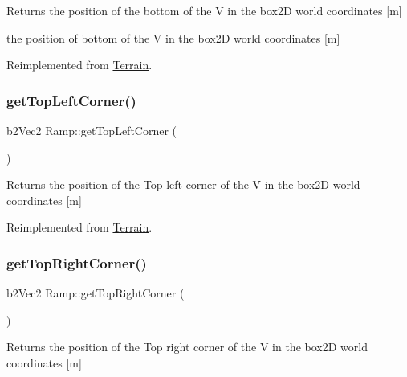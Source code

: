 \begin{DoxyReturn}{Returns}
the position of the bottom of the V in the box2D world coordinates \mbox{[}m\mbox{]}

the position of bottom of the V in the box2D world coordinates \mbox{[}m\mbox{]} 
\end{DoxyReturn}


Reimplemented from \mbox{\hyperlink{class_terrain_a26e1c7c05b8256015730df34d97d29c2}{Terrain}}.

\mbox{\label{class_ramp_aefcb53f7b43d3706400e7f16c77a7e18}} 
\subsubsection{\texorpdfstring{get\+Top\+Left\+Corner()}{getTopLeftCorner()}}
{\footnotesize\ttfamily b2\+Vec2 Ramp\+::get\+Top\+Left\+Corner (\begin{DoxyParamCaption}{ }\end{DoxyParamCaption})\hspace{0.3cm}{\ttfamily [virtual]}}

\begin{DoxyReturn}{Returns}
the position of the Top left corner of the V in the box2D world coordinates \mbox{[}m\mbox{]} 
\end{DoxyReturn}


Reimplemented from \mbox{\hyperlink{class_terrain_a8a8629396e5cb03961649acdc23eacf2}{Terrain}}.

\mbox{\label{class_ramp_a72b5d41278e4ff65df8f80657ae7d9e1}} 
\subsubsection{\texorpdfstring{get\+Top\+Right\+Corner()}{getTopRightCorner()}}
{\footnotesize\ttfamily b2\+Vec2 Ramp\+::get\+Top\+Right\+Corner (\begin{DoxyParamCaption}{ }\end{DoxyParamCaption})\hspace{0.3cm}{\ttfamily [virtual]}}

\begin{DoxyReturn}{Returns}
the position of the Top right corner of the V in the box2D world coordinates \mbox{[}m\mbox{]} 
\end{DoxyReturn}


